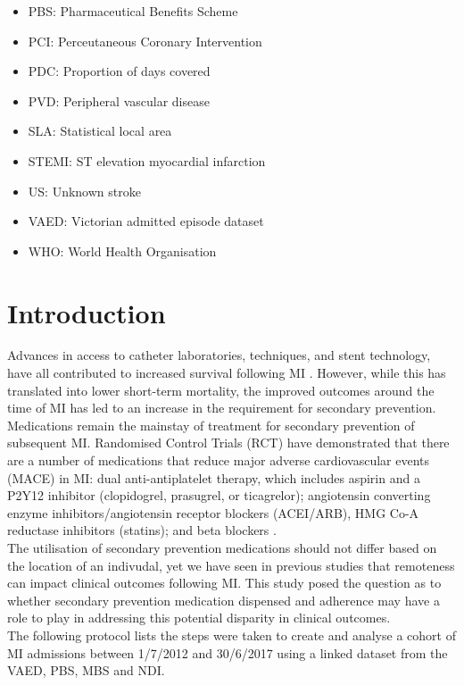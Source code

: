 \documentclass[11pt]{article}
\begin{document}
\begin{itemize}
\item PBS: Pharmaceutical Benefits Scheme
\item PCI: Perceutaneous Coronary Intervention
\item PDC: Proportion of days covered
\item PVD: Peripheral vascular disease
\item SLA: Statistical local area
\item STEMI: ST elevation myocardial infarction
\item US: Unknown stroke
\item VAED: Victorian admitted episode dataset
\item WHO: World Health Organisation
\end{itemize}

\pagebreak

\section{Introduction}

Advances in access to catheter laboratories, techniques, and stent technology, have all contributed to increased survival following MI \cite{chew2016}. However, while this has translated into lower short-term mortality, the improved outcomes around the time of MI has led to an increase in the requirement for secondary prevention. Medications remain the mainstay of treatment for secondary prevention of subsequent MI. Randomised Control Trials (RCT) have demonstrated that there are a number of medications that reduce major adverse cardiovascular events (MACE) in MI: dual anti-antiplatelet therapy, which includes aspirin and a P2Y12 inhibitor (clopidogrel, prasugrel, or ticagrelor); angiotensin converting enzyme inhibitors/angiotensin receptor blockers (ACEI/ARB), HMG Co-A reductase inhibitors (statins); and beta blockers \cite{chew2016}. \\
The utilisation of secondary prevention medications should not differ based on the location of an indivudal, yet we have seen in previous studies that remoteness can impact clinical outcomes following MI. This study posed the question as to whether secondary prevention medication dispensed and adherence may have a role to play in addressing this potential disparity in clinical outcomes. \\
The following protocol lists the steps were taken to create and analyse a cohort of MI admissions between 1/7/2012 and 30/6/2017 using a linked dataset from the VAED, PBS, MBS and NDI. 
\end{document}
